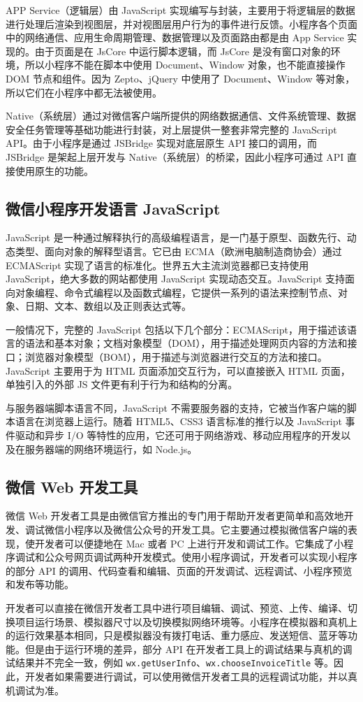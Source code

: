 APP Service（逻辑层）由 JavaScript 实现编写与封装，主要用于将逻辑层的数据进行处理后渲染到视图层，并对视图层用户行为的事件进行反馈。小程序各个页面中的网络通信、应用生命周期管理、数据管理以及页面路由都是由 App Service 实现的。由于页面是在 JsCore 中运行脚本逻辑，而 JsCore 是没有窗口对象的环境，所以小程序不能在脚本中使用 Document、Window 对象，也不能直接操作 DOM 节点和组件。因为 Zepto、jQuery 中使用了 Document、Window 等对象，所以它们在小程序中都无法被使用\cite{bib:jquery}。

Native（系统层）通过对微信客户端所提供的网络数据通信、文件系统管理、数据安全任务管理等基础功能进行封装，对上层提供一整套非常完整的 JavaScript API。由于小程序是通过 JSBridge 实现对底层原生 API 接口的调用，而 JSBridge 是架起上层开发与 Native（系统层）的桥梁，因此小程序可通过 API 直接使用原生的功能。

\subsection{微信小程序开发语言 JavaScript}

JavaScript 是一种通过解释执行的高级编程语言，是一门基于原型、函数先行、动态类型、面向对象的解释型语言。它已由 ECMA（欧洲电脑制造商协会）通过 ECMAScript 实现了语言的标准化。世界五大主流浏览器都已支持使用 JavaScript，绝大多数的网站都使用 JavaScript 实现动态交互\cite{bib:zakas}。JavaScript 支持面向对象编程、命令式编程以及函数式编程，它提供一系列的语法来控制节点、对象、日期、文本、数组以及正则表达式等。

一般情况下，完整的 JavaScript 包括以下几个部分：ECMAScript，用于描述该语言的语法和基本对象；文档对象模型（DOM），用于描述处理网页内容的方法和接口；浏览器对象模型（BOM），用于描述与浏览器进行交互的方法和接口。JavaScript 主要用于为 HTML 页面添加交互行为，可以直接嵌入 HTML 页面，单独引入的外部 JS 文件更有利于行为和结构的分离\cite{bib:ruan}。

与服务器端脚本语言不同，JavaScript 不需要服务器的支持，它被当作客户端的脚本语言在浏览器上运行。随着 HTML5、CSS3 语言标准的推行以及 JavaScript 事件驱动和异步 I/O 等特性的应用，它还可用于网络游戏、移动应用程序的开发以及在服务器端的网络环境运行，如 Node.js。

\subsection{微信 Web 开发工具}

微信 Web 开发者工具是由微信官方推出的专门用于帮助开发者更简单和高效地开发、调试微信小程序以及微信公众号的开发工具。它主要通过模拟微信客户端的表现，使开发者可以便捷地在 Mac 或者 PC 上进行开发和调试工作。它集成了小程序调试和公众号网页调试两种开发模式。使用小程序调试，开发者可以实现小程序的部分 API 的调用、代码查看和编辑、页面的开发调试、远程调试、小程序预览和发布等功能。

开发者可以直接在微信开发者工具中进行项目编辑、调试、预览、上传、编译、切换项目运行场景、模拟器尺寸以及切换模拟网络环境等。小程序在模拟器和真机上的运行效果基本相同，只是模拟器没有拨打电话、重力感应、发送短信、蓝牙等功能。但是由于运行环境的差异，部分 API 在开发者工具上的调试结果与真机的调试结果并不完全一致，例如 \texttt{wx.getUserInfo}、\texttt{wx.chooseInvoiceTitle} 等。因此，开发者如果需要进行调试，可以使用微信开发者工具的远程调试功能，并以真机调试为准。
